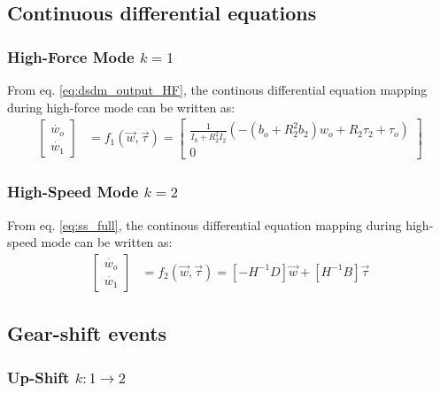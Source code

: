 
\subsection{Continuous differential equations}

\subsubsection{High-Force Mode $k=1$}

From eq. \eqref{eq:dsdm_output_HF}, the continous differential equation mapping during high-force mode can be written as:
%
\begin{align}
\left[
\begin{array}{c}
\dot{w_o}\\
\dot{w_1}
\end{array}
\right] &= f_1( \vec{w} , \vec{\tau} ) = 
\left[ \begin{array}{c}
\frac{1}{I_0 + R^2_2 I_2}\left( -(b_o + R_2^2 b_2) w_o + R_2 \tau_2 + \tau_o \right)\\
0
\end{array} \right]
\label{eq:f1}
\end{align}


\subsubsection{High-Speed Mode $k=2$}

From eq. \eqref{eq:ss_full}, the continous differential equation mapping during high-speed mode can be written as:
%
\begin{align}
\left[
\begin{array}{c}
\dot{w_o}\\
\dot{w_1}
\end{array}
\right] &= f_2( \vec{w} , \vec{\tau} ) = 
\left[ -H^{-1} D \right]
\vec{w} 
+ 
\left[ H^{-1} B \right] 
\vec{\tau}
\label{eq:f2}
\end{align}


\subsection{Gear-shift events}

\subsubsection{Up-Shift $k:1\rightarrow2$}

